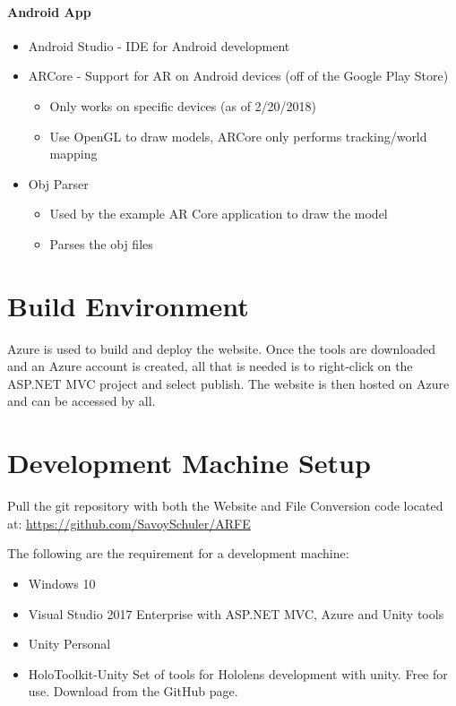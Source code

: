 \paragraph{Android App}
\begin{itemize}
    \item Android Studio - IDE for Android development
    \item ARCore - Support for AR on Android devices (off of the Google Play Store)
    \begin{itemize}
        \item Only works on specific devices (as of 2/20/2018)
        \item Use OpenGL to draw models, ARCore only performs tracking/world mapping
    \end{itemize}
    \item Obj Parser
    \begin{itemize}
        \item Used by the example AR Core application to draw the model
        \item Parses the obj files
    \end{itemize}
\end{itemize}

\section{Build  Environment}
Azure is used to build and deploy the website. Once the tools are downloaded and an Azure account is created, 
all that is needed is to right-click on the ASP.NET MVC project and select publish. The website is then hosted on Azure and
can be accessed by all.
\section{Development Machine Setup}

Pull the git repository with both the Website and File Conversion code located at: \url{https://github.com/SavoySchuler/ARFE}


The following are the requirement for a development machine:
\begin{itemize}
    \item Windows 10
    \item Visual Studio 2017 Enterprise with ASP.NET MVC, Azure and Unity tools
    \item Unity Personal
    \item HoloToolkit-Unity Set of tools for Hololens development with unity. Free for use. Download from the GitHub page.
\end{itemize}


